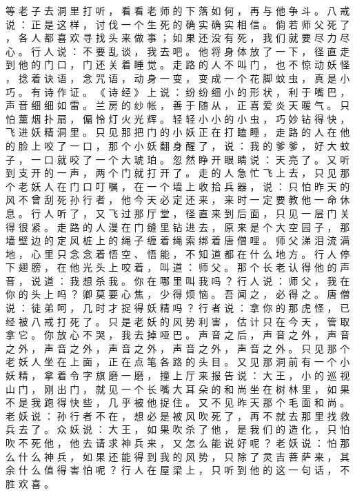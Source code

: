 {等 老 子 去 洞 里 打 听 ， 看 看 老 师 的 下 落 如 何 ， 再 与 他 争 斗 。
八 戒 说 ： 正 是 这 样 ， 讨 伐 一 个 生 死 的 确 实 确 实 相 信 。
倘 若 师 父 死 了 ， 各 人 都 喜 欢 寻 找 头 来 做 事 ； 如 果 还 没 有 死 ， 我 们 就 要 尽 力 尽 心 。
行 人 说 ： 不 要 乱 谈 ， 我 去 吧 。
他 将 身 体 放 了 一 下 ， 径 直 走 到 他 的 门 口 ， 门 还 关 着 睡 觉 。
走 路 的 人 不 叫 门 ， 也 不 惊 动 妖 怪 ， 捻 着 诀 语 ， 念 咒 语 ， 动 身 一 变 ， 变 成 一 个 花 脚 蚊 虫 ， 真 是 小 巧 。
有 诗 作 证 。
《 诗 经 》 上 说 ： 纷 纷 细 小 的 形 状 ， 利 于 嘴 巴 ， 声 音 细 细 如 雷 。
兰 房 的 纱 帐 ， 善 于 随 从 ， 正 喜 爱 炎 天 暖 气 。
只 怕 薰 烟 扑 扇 ， 偏 怜 灯 火 光 辉 。
轻 轻 小 小 的 小 虫 ， 巧 妙 钻 得 快 ， 飞 进 妖 精 洞 里 。
只 见 那 把 门 的 小 妖 正 在 打 瞌 睡 ， 走 路 的 人 在 他 的 脸 上 咬 了 一 口 ， 那 个 小 妖 翻 身 醒 了 ， 说 ： 我 的 爹 爹 ， 好 大 蚊 子 ， 一 口 就 咬 了 一 个 大 琥 珀 。
忽 然 睁 开 眼 睛 说 ： 天 亮 了 。
又 听 到 支 开 的 一 声 ， 两 个 门 就 打 开 了 。
走 的 人 急 忙 飞 上 去 ， 只 见 那 个 老 妖 人 在 门 口 叮 嘱 ， 在 一 个 墙 上 收 拾 兵 器 ， 说 ： 只 怕 昨 天 的 风 不 曾 刮 死 孙 行 者 ， 他 今 天 必 定 还 来 ， 来 时 一 定 要 教 他 一 命 休 息 。
行 人 听 了 ， 又 飞 过 那 厅 堂 ， 径 直 来 到 后 面 ， 只 见 一 层 门 关 得 很 紧 。
走 路 的 人 漫 在 门 缝 里 钻 进 去 ， 原 来 是 个 大 空 园 子 ， 那 墙 壁 边 的 定 风 桩 上 的 绳 子 缠 着 绳 索 绑 着 唐 僧 哩 。
师 父 涕 泪 流 满 地 ， 心 里 只 念 念 着 悟 空 、 悟 能 ， 不 知 道 都 在 什 么 地 方 。
行 人 停 下 翅 膀 ， 在 他 光 头 上 咬 着 ， 叫 道 ： 师 父 。
那 个 长 老 认 得 他 的 声 音 ， 说 道 ： 我 想 杀 我 。
你 在 哪 里 叫 我 吗 ？ 行 人 说 ： 师 父 ， 我 在 你 的 头 上 吗 ？
卿 莫 要 心 焦 ， 少 得 烦 恼 。
吾 闻 之 ， 必 得 之 。
唐 僧 说 ： 徒 弟 呵 ， 几 时 才 捉 得 妖 精 吗 ？ 行 者 说 ： 拿 你 的 那 虎 怪 ， 已 经 被 八 戒 打 死 了 。
只 是 老 妖 的 风 势 利 害 ， 估 计 只 在 今 天 ， 管 取 拿 它 。
你 放 心 不 哭 ， 我 去 掉 哑 巴 。
声 音 之 后 ， 声 音 之 外 ， 声 音 之 外 ， 声 音 之 外 ， 声 音 之 外 ， 声 音 之 外 ， 声 音 之 外 。
只 见 那 个 老 妖 人 坐 在 上 面 ， 正 在 点 笔 各 路 的 头 目 。
又 见 那 洞 前 有 一 个 小 妖 精 ， 拿 着 令 字 旗 磨 一 磨 ， 撞 上 厅 来 报 告 说 ： 大 王 ， 小 的 巡 视 山 门 ， 刚 出 门 ， 就 见 一 个 长 嘴 大 耳 朵 的 和 尚 坐 在 树 林 里 ， 如 果 不 是 我 跑 得 快 些 ， 几 乎 被 他 捉 住 。
又 不 见 昨 天 那 个 毛 面 和 尚 。
老 妖 说 ： 孙 行 者 不 在 ， 想 必 是 被 风 吹 死 了 ， 再 不 就 去 那 里 找 救 兵 去 了 。
众 妖 说 ： 大 王 ， 如 果 吹 杀 了 他 ， 是 我 们 的 造 化 ， 只 怕 吹 不 死 他 ， 他 去 请 求 神 兵 来 ， 又 怎 么 能 说 好 呢 ？ 老 妖 说 ： 怕 那 么 什 么 神 兵 ， 如 果 还 能 得 到 我 的 风 势 ， 只 除 了 灵 吉 菩 萨 来 ， 其 余 什 么 值 得 害 怕 呢 ？ 行 人 在 屋 梁 上 ， 只 听 到 他 的 这 一 句 话 ， 不 胜 欢 喜 。
}
